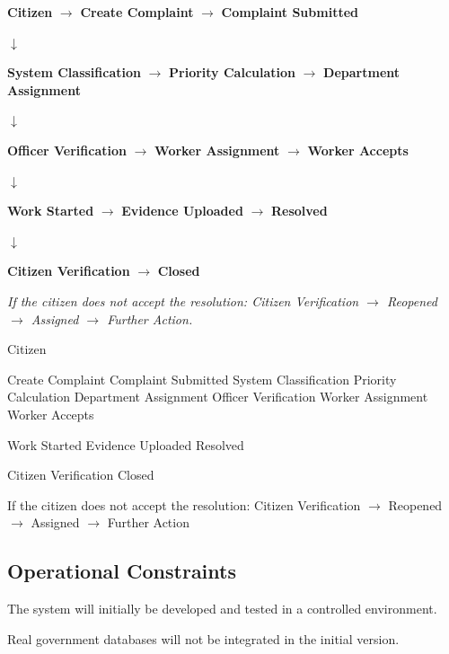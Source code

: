 \documentclass[12pt,a4paper]{article}
\begin{document}
\begin{center}
\small
\textbf{Citizen}
$\rightarrow$
\textbf{Create Complaint}
$\rightarrow$
\textbf{Complaint Submitted}

\vspace{3pt}
$\downarrow$

\vspace{3pt}
\textbf{System Classification}
$\rightarrow$
\textbf{Priority Calculation}
$\rightarrow$
\textbf{Department Assignment}

\vspace{3pt}
$\downarrow$

\vspace{3pt}
\textbf{Officer Verification}
$\rightarrow$
\textbf{Worker Assignment}
$\rightarrow$
\textbf{Worker Accepts}

\vspace{3pt}
$\downarrow$

\vspace{3pt}
\textbf{Work Started}
$\rightarrow$
\textbf{Evidence Uploaded}
$\rightarrow$
\textbf{Resolved}

\vspace{3pt}
$\downarrow$

\vspace{3pt}
\textbf{Citizen Verification}
$\rightarrow$
\textbf{Closed}
\end{center}

\textit{If the citizen does not accept the resolution: Citizen Verification
$\rightarrow$ Reopened $\rightarrow$ Assigned $\rightarrow$ Further Action.}

Citizen

Create Complaint Complaint Submitted System Classification Priority Calculation Department Assignment Officer Verification Worker Assignment Worker Accepts

Work Started Evidence Uploaded Resolved

Citizen Verification Closed

If the citizen does not accept the resolution: Citizen Verification $\rightarrow$ Reopened $\rightarrow$ Assigned $\rightarrow$ Further Action

\subsection{Operational Constraints}
The system will initially be developed and tested in a controlled environment.

Real government databases will not be integrated in the initial version.
\end{document}
